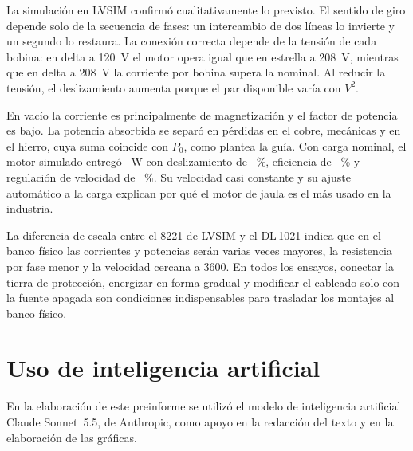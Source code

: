 \documentclass[conference]{IEEEtran}
\begin{document}
La simulación en LVSIM confirmó cualitativamente lo previsto. El sentido de giro depende solo de la secuencia de fases: un intercambio de dos líneas lo invierte y un segundo lo restaura. La conexión correcta depende de la tensión de cada bobina: en delta a \SI{120}{V} el motor opera igual que en estrella a \SI{208}{V}, mientras que en delta a \SI{208}{V} la corriente por bobina supera la nominal. Al reducir la tensión, el deslizamiento aumenta porque el par disponible varía con $V^2$.

En vacío la corriente es principalmente de magnetización y el factor de potencia es bajo. La potencia absorbida se separó en pérdidas en el cobre, mecánicas y en el hierro, cuya suma coincide con $P_0$, como plantea la guía. Con carga nominal, el motor simulado entregó \CnomPout~\si{W} con deslizamiento de \Cnoms~\%, eficiencia de \Cnometa~\% y regulación de velocidad de \CRV~\%. Su velocidad casi constante y su ajuste automático a la carga explican por qué el motor de jaula es el más usado en la industria.

La diferencia de escala entre el 8221 de LVSIM y el DL\,1021 indica que en el banco físico las corrientes y potencias serán varias veces mayores, la resistencia por fase menor y la velocidad cercana a \SI{3600}{\rpm}. En todos los ensayos, conectar la tierra de protección, energizar en forma gradual y modificar el cableado solo con la fuente apagada son condiciones indispensables para trasladar los montajes al banco físico.

\section{Uso de inteligencia artificial}
En la elaboración de este preinforme se utilizó el modelo de inteligencia artificial Claude Sonnet~5.5, de Anthropic, como apoyo en la redacción del texto y en la elaboración de las gráficas.
\end{document}
